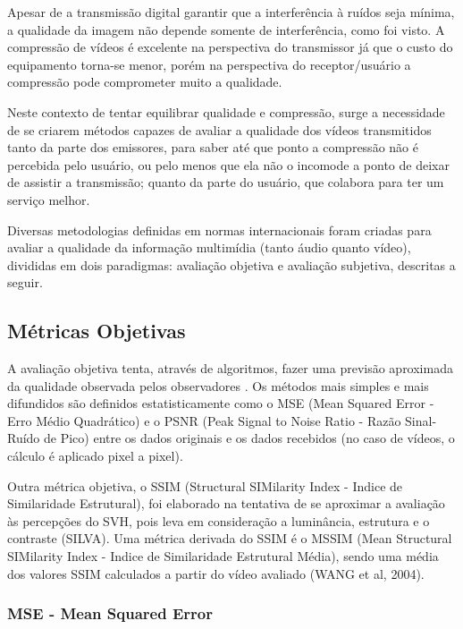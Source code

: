 Apesar de a transmissão digital garantir que a interferência à ruídos seja mínima, a qualidade da imagem não depende somente de interferência, como foi visto. A compressão de vídeos é excelente na perspectiva do transmissor já que o custo do equipamento torna-se menor, porém na perspectiva do receptor/usuário a compressão pode comprometer muito a qualidade.

Neste contexto de tentar equilibrar qualidade e compressão, surge a necessidade de se criarem métodos capazes de avaliar a qualidade dos vídeos transmitidos tanto da parte dos emissores, para saber até que ponto a compressão não é percebida pelo usuário, ou pelo menos que ela não o incomode a ponto de deixar de assistir a transmissão; quanto da parte do usuário, que colabora para ter um serviço melhor.

Diversas metodologias definidas em normas internacionais foram criadas para avaliar a qualidade da informação multimídia (tanto áudio quanto vídeo), divididas em dois paradigmas: avaliação objetiva e avaliação subjetiva, descritas a seguir.

\subsection{Métricas Objetivas}

A avaliação objetiva tenta, através de algoritmos, fazer uma previsão aproximada da qualidade observada pelos observadores \cite{albini}. Os métodos mais simples e mais difundidos são definidos estatisticamente como o MSE (Mean Squared Error - Erro Médio Quadrático) e o PSNR (Peak Signal to Noise Ratio - Razão Sinal-Ruído de Pico) \cite{emmersonsilva} entre os dados originais e os dados recebidos (no caso de vídeos, o cálculo é aplicado pixel a pixel).

Outra métrica objetiva, o SSIM (Structural SIMilarity Index - Indice de Similaridade Estrutural), foi elaborado na tentativa de se aproximar a avaliação às percepções do SVH, pois leva em consideração a luminância, estrutura e o contraste (SILVA). Uma métrica derivada do SSIM é o MSSIM (Mean Structural SIMilarity Index - Indice de Similaridade Estrutural Média), sendo uma média dos valores SSIM calculados a partir do vídeo avaliado (WANG et al, 2004).

\subsubsection[MSE]{MSE - Mean Squared Error}

